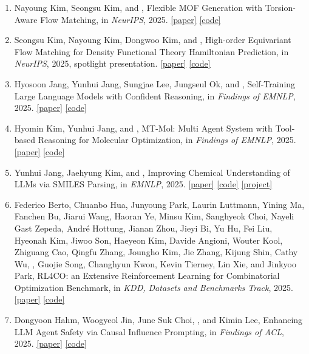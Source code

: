 \begin{enumerate}
\item Nayoung Kim, Seongsu Kim, and , Flexible MOF Generation with Torsion-Aware Flow Matching, in \textit{NeurIPS}, 2025. \mbox{\href{https://arxiv.org/abs/2505.17914}{[paper]}} \mbox{\href{https://github.com/nayoung10/MOFFlow-2}{[code]}}
\item Seongsu Kim, Nayoung Kim, Dongwoo Kim, and , High-order Equivariant Flow Matching for Density Functional Theory Hamiltonian Prediction, in \textit{NeurIPS}, 2025, \textcolor{WineRed}{spotlight presentation}. \mbox{\href{https://arxiv.org/abs/2505.18817}{[paper]}} \mbox{\href{https://github.com/seongsukim-ml/QHFlow}{[code]}}
\item Hyosoon Jang, Yunhui Jang, Sungjae Lee, Jungseul Ok, and , Self-Training Large Language Models with Confident Reasoning, in \textit{Findings of EMNLP}, 2025. \mbox{\href{https://arxiv.org/abs/2505.17454}{[paper]}} \mbox{\href{https://github.com/hsjang0/CORE-PO}{[code]}}
\item Hyomin Kim, Yunhui Jang, and , MT-Mol: Multi Agent System with Tool-based Reasoning for Molecular Optimization, in \textit{Findings of EMNLP}, 2025. \mbox{\href{https://arxiv.org/abs/2505.20820}{[paper]}} \mbox{\href{https://github.com/icecream126/mt_mol}{[code]}}
\item Yunhui Jang, Jaehyung Kim, and , Improving Chemical Understanding of LLMs via SMILES Parsing, in \textit{EMNLP}, 2025. \mbox{\href{https://arxiv.org/abs/2505.16340}{[paper]}} \mbox{\href{https://github.com/yunhuijang/CLEANMOL}{[code]}} \mbox{\href{https://yunhuijang.github.io/projects/CLEANMOL/}{[project]}}
\item Federico Berto, Chuanbo Hua, Junyoung Park, Laurin Luttmann, Yining Ma, Fanchen Bu, Jiarui Wang, Haoran Ye, Minsu Kim, Sanghyeok Choi, Nayeli Gast Zepeda, Andr\'{e} Hottung, Jianan Zhou, Jieyi Bi, Yu Hu, Fei Liu, Hyeonah Kim, Jiwoo Son, Haeyeon Kim, Davide Angioni, Wouter Kool, Zhiguang Cao, Qingfu Zhang, Joungho Kim, Jie Zhang, Kijung Shin, Cathy Wu, , Guojie Song, Changhyun Kwon, Kevin Tierney, Lin Xie, and Jinkyoo Park, RL4CO: an Extensive Reinforcement Learning for Combinatorial Optimization Benchmark, in \textit{KDD, Datasets and Benchmarks Track}, 2025. \mbox{\href{https://arxiv.org/abs/2306.17100}{[paper]}} \mbox{\href{https://github.com/ai4co/rl4co}{[code]}}
\item Dongyoon Hahm, Woogyeol Jin, June Suk Choi, , and Kimin Lee, Enhancing LLM Agent Safety via Causal Influence Prompting, in \textit{Findings of ACL}, 2025. \mbox{\href{https://arxiv.org/abs/2507.00979}{[paper]}} \mbox{\href{https://github.com/HahmDY/causal_influence_prompting}{[code]}}

\end{enumerate}
